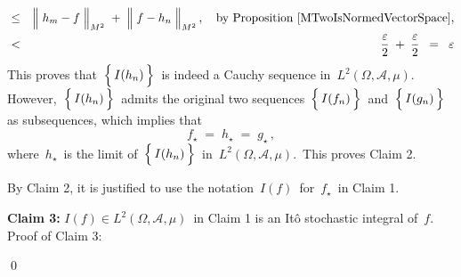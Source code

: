 \begin{enumerate}
\begin{eqnarray*}
	\\
	& \leq &
		\left\Vert\; h_{m} \overset{{\color{white}.}}{-} f \;\right\Vert_{M^{2}}
		\; + \;
		\left\Vert\; f \overset{{\color{white}.}}{-} h_{n} \;\right\Vert_{M^{2}},
		\quad
		\textnormal{by Proposition \ref{MTwoIsNormedVectorSpace}},
	\\
	& < &
		\dfrac{\varepsilon}{2} \; + \; \dfrac{\varepsilon}{2}
	\;\; = \;\; \varepsilon
	\end{eqnarray*}
	This proves that \,$\left\{\,\overset{{\color{white}.}}{I(h_{n})}\,\right\}$\,
	is indeed a Cauchy sequence in \,$L^{2}(\Omega,\mathcal{A},\mu)$.
	However,
	\,$\left\{\,\overset{{\color{white}.}}{I(h_{n})}\,\right\}$\,
	admits the original two sequences
	\,$\left\{\,\overset{{\color{white}.}}{I(f_{n})}\,\right\}$\,
	and
	\,$\left\{\,\overset{{\color{white}.}}{I(g_{n})}\,\right\}$\,
	as subsequences, which implies that
	\begin{equation*}
	f_{\star} \; = \; h_{\star} \; = \; g_{\star}\,,
	\end{equation*}
	where \,$h_{\star}$\, is the limit of
	\,$\left\{\,\overset{{\color{white}.}}{I(h_{n})}\,\right\}$\,
	in \,$L^{2}(\Omega,\mathcal{A},\mu)$.\,
	This proves Claim 2.
	
	\vskip 0.5cm
	\noindent
	By Claim 2, it is justified to use the notation \,$I(f)$\, for \,$f_{\star}$\, in Claim 1.

	\vskip 0.5cm
	\textbf{Claim 3:}\quad
	$I(f) \in L^{2}(\Omega,\mathcal{A},\mu)$\, in Claim 1 is an It\^{o} stochastic integral of \,$f$.\,
	\vskip 0.2cm
	\noindent
	Proof of Claim 3:\quad

\end{enumerate}
\qed

